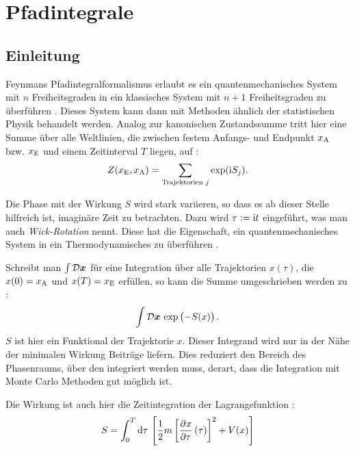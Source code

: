 
\chapter{Pfadintegrale}

\section{Einleitung}

Feynmans Pfadintegralformalismus erlaubt es ein quantenmechanisches System mit
$n$ Freiheitsgraden in ein klassisches System mit $n+1$ Freiheitsgraden zu
überführen \parencite[§12.4]{Thijssen/Computational_Physics}. Dieses System
kann dann mit Methoden ähnlich der statistischen Physik behandelt werden.
Analog zur kanonischen Zustandssumme tritt hier eine Summe über alle
Weltlinien, die zwischen festem Anfangs- und Endpunkt $x_\text A$ bzw. $x_\text
E$ und einem Zeitinterval $T$ liegen, auf
\parencite[(2.7)]{Creutz/Statistical_Approach_QM}:
\[
    Z(x_\text E, x_\text A) = \sum_{\text{Trajektorien $j$}} \exp(\mathrm i S_j).
\]

Die Phase mit der Wirkung $S$ wird stark variieren, so dass es ab dieser Stelle
hilfreich ist, imaginäre Zeit zu betrachten. Dazu wird $\tau := \mathrm i t$
eingeführt, was man auch \emph{Wick-Rotation} nennt. Diese hat die Eigenschaft,
ein quantenmechanisches System in ein Thermodynamisches zu überführen
\parencite[24]{Stetz/AQT}.

Schreibt man $\int \mathcal D \boldsymbol{x}$ für eine Integration über alle
Trajektorien $x(\tau)$, die $x(0) = x_\text A$ und $x(T) = x_\text E$ erfüllen,
so kann die Summe umgeschrieben werden zu
\parencite[(2.1)]{Creutz/Statistical_Approach_QM}:
\[
    \int \funcmeasure \, \exp\del{-S(x)}.
\]
$S$ ist hier ein Funktional der Trajektorie $x$. Dieser Integrand wird nur in
der Nähe der minimalen Wirkung Beiträge liefern. Dies reduziert den Bereich des
Phasenraums, über den integriert werden muss, derart, dass die Integration mit
Monte Carlo Methoden gut möglich ist.

Die Wirkung ist auch hier die Zeitintegration der Lagrangefunktion
\parencite[(2.5)]{Creutz/Statistical_Approach_QM}:
\[
    S = \int_0^T \dif \tau \, \sbr{\frac 12 m \sbr{\dpd x\tau(\tau)}^2 + V(x)}
\]

